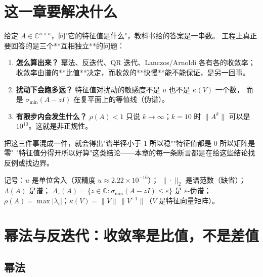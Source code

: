 

\section{这一章要解决什么}

给定 $A\in\mathbb{C}^{n\times n}$，问"它的特征值是什么"，教科书给的答案是一串数。
工程上真正要回答的是三个**互相独立**的问题：

\begin{enumerate}
  \item \textbf{怎么算出来？} 幂法、反迭代、QR 迭代、Lanczos/Arnoldi 各有各的收敛率；
        收敛率由谱的**比值**决定，而收敛的**快慢**能不能保证，是另一回事。
  \item \textbf{扰动下会跑多远？} 特征值对扰动的敏感度不是 $u$ 也不是 $\kappa(V)$ 一个数，
        而是 $\sigma_{\min}(A-zI)$ 在复平面上的等值线（伪谱）。
  \item \textbf{有限步内会发生什么？} $\rho(A)<1$ 只说 $k\to\infty$；$k=10$ 时
        $\|A^k\|$ 可以是 $10^{10}$。这就是非正规性。
\end{enumerate}

把这三件事混成一件，就会得出"谱半径小于 1 所以稳""特征值都是 0 所以矩阵是零"
"特征值分得开所以好算"这类结论——本章的每一条断言都是在给这些结论找反例或找边界。

记号：$u$ 是单位舍入（双精度 $u\approx2.22\times10^{-16}$）；
$\|\cdot\|_2$ 是谱范数（缺省）；$\Lambda(A)$ 是谱；
$\Lambda_\varepsilon(A)=\{z\in\mathbb{C}:\sigma_{\min}(A-zI)\le\varepsilon\}$ 是 $\varepsilon$-伪谱；
$\rho(A)=\max|\lambda_i|$；$\kappa(V)=\|V\|\,\|V^{-1}\|$（$V$ 是特征向量矩阵）。

\section{幂法与反迭代：收敛率是比值，不是差值}

\subsection{幂法}

